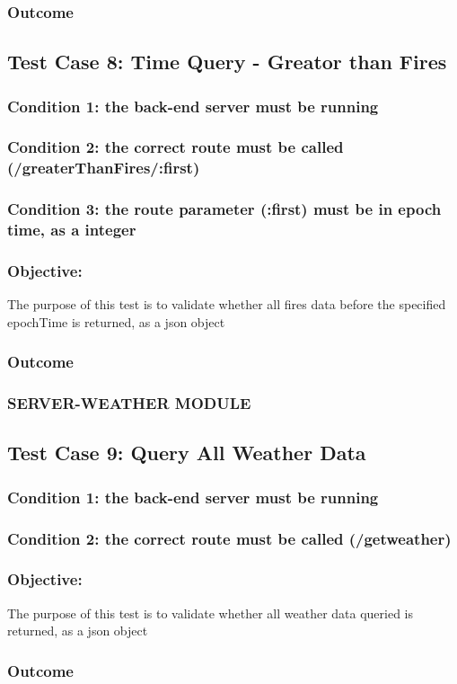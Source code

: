\subsubsection{Outcome}


\subsection{Test Case 8: Time Query - Greator than Fires}
\subsubsection{Condition 1: the back-end server must be running}
\subsubsection{Condition 2: the correct route must be called (/greaterThanFires/:first)}
\subsubsection{Condition 3: the route parameter (:first) must be in epoch time, as a integer}
\subsubsection{Objective:} The purpose of this test is to validate whether all fires data before the specified epochTime is returned, as a json object
\subsubsection{Outcome}

\subsubsection*{SERVER-WEATHER MODULE}

\subsection{Test Case 9: Query All Weather Data}
\subsubsection{Condition 1: the back-end server must be running}
\subsubsection{Condition 2: the correct route must be called (/getweather)}

\subsubsection{Objective:} The purpose of this test is to validate whether all weather data queried is returned, as a json object
\subsubsection{Outcome}

